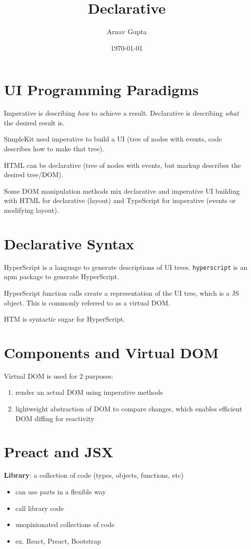 \documentclass[11pt]{article}
\author{Arnav Gupta}
\date{\today}
\title{Declarative}
\begin{document}
\maketitle
\tableofcontents

\section{UI Programming Paradigms}
\label{sec:org843ccc0}
Imperative is describing \emph{how} to achieve a result.
Declarative is describing \emph{what} the desired result is.

SimpleKit used imperative to build a UI (tree of nodes with events, code describes how to
make that tree).

HTML can be declarative (tree of nodes with events, but markup describes the desired tree/DOM).

Some DOM manipulation methods mix declarative and imperative UI building with HTML
for declarative (layout) and TypeScript for imperative (events or modifying layout).
\section{Declarative Syntax}
\label{sec:org4356248}
HyperScript is a language to generate descriptions of UI trees.
\texttt{hyperscript} is an npm package to generate HyperScript.

HyperScript function calls create a representation of the UI tree, which is a JS object.
This is commonly referred to as a virtual DOM.

HTM is syntactic sugar for HyperScript.
\section{Components and Virtual DOM}
\label{sec:org450ec9d}
Virtual DOM is used for 2 purposes:
\begin{enumerate}
\item render an actual DOM using imperative methods
\item lightweight abstraction of DOM to compare changes, which enables efficient DOM diffing for
reactivity
\end{enumerate}
\section{Preact and JSX}
\label{sec:orge51820b}
\textbf{Library}: a collection of code (types, objects, functions, etc)
\begin{itemize}
\item can use parts in a flexible way
\item call library code
\item unopinionated collections of code
\item ex. React, Preact, Bootstrap
\end{itemize}
\end{document}
